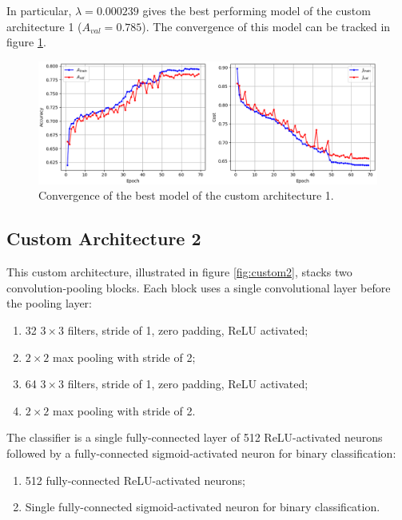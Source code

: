 In particular, $\lambda = 0.000239$ gives the best performing model of the custom architecture 1 ($A_{val} = 0.785$). The convergence of this model can be tracked in figure \ref{fig:custom1_best_training}.

\begin{figure}[ht]
    \centering
    \includegraphics[width=1.0\textwidth]{figs/custom1_best_training.png}
    \caption{Convergence of the best model of the custom architecture 1.}
    \label{fig:custom1_best_training}
\end{figure}

\subsection{Custom Architecture 2}

This custom architecture, illustrated in figure \ref{fig:custom2}, stacks two convolution-pooling blocks. Each block uses a single convolutional layer before the pooling layer:

\begin{enumerate}
    \item 32 $3 \times 3$ filters, stride of 1, zero padding, ReLU activated;
    \item $2 \times 2$ max pooling with stride of 2;
    \item 64 $3 \times 3$ filters, stride of 1, zero padding, ReLU activated;
    \item $2 \times 2$ max pooling with stride of 2.
\end{enumerate}

The classifier is a single fully-connected layer of 512 ReLU-activated neurons followed by a fully-connected sigmoid-activated neuron for binary classification:

\begin{enumerate}
    \item 512 fully-connected ReLU-activated neurons;
    \item Single fully-connected sigmoid-activated neuron for binary classification.
\end{enumerate}

